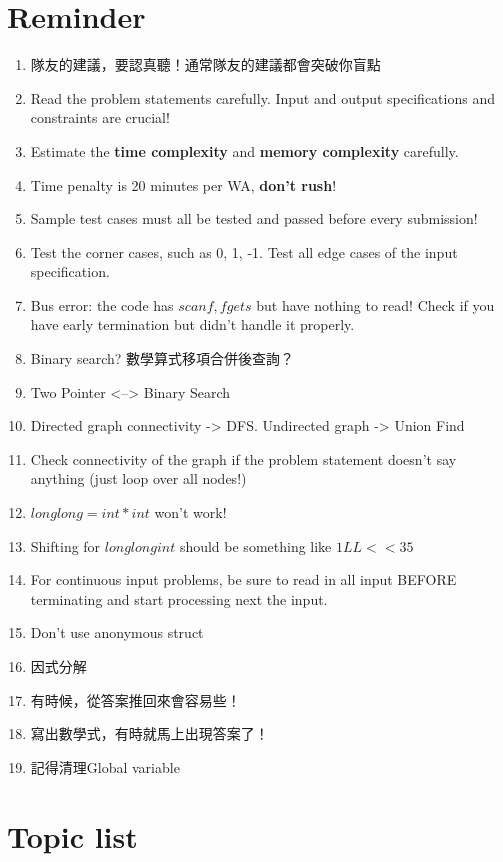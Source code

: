 \documentclass[10pt,oneside]{article}
\begin{document}
\begin{landscape}
\begin{multicols}{2}

\section{Reminder}

\begin{enumerate}
	\item 隊友的建議，要認真聽！通常隊友的建議都會突破你盲點
	\item Read the problem statements carefully. Input and output specifications and constraints are crucial!
	\item Estimate the \textbf{time complexity} and \textbf{memory complexity} carefully.
	\item Time penalty is 20 minutes per WA, \textbf{don't rush}!
	\item Sample test cases must all be tested and passed before every submission!
	\item Test the corner cases, such as 0, 1, -1. Test all edge cases of the input specification.
	\item Bus error: the code has $scanf, fgets$ but have nothing to read! Check if you have early termination but didn't handle it properly.
	\item Binary search? 數學算式移項合併後查詢？
	\item Two Pointer <--> Binary Search
	\item Directed graph connectivity -> DFS. Undirected graph -> Union Find
	\item Check connectivity of the graph if the problem statement doesn't say anything (just loop over all nodes!)
	\item $long long = int * int$ won't work!
	\item Shifting for $long long int$ should be something like $1LL << 35$
	\item For continuous input problems, be sure to read in all input BEFORE terminating and start processing next the input.
	\item Don't use anonymous struct
	\item 因式分解
	\item 有時候，從答案推回來會容易些！
	\item 寫出數學式，有時就馬上出現答案了！ %
	\item 記得清理Global variable
\end{enumerate}

\section{Topic list}


\end{multicols}
\end{landscape}
\end{document}
